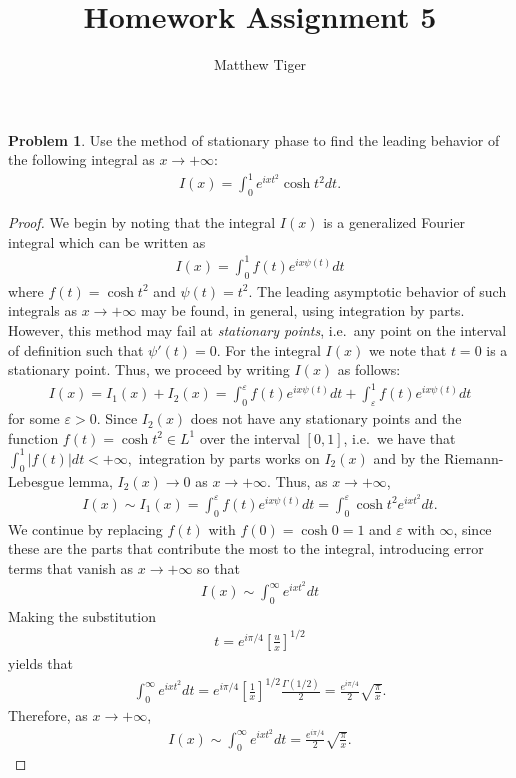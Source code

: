 \documentclass[12pt]{article}
\title{Homework Assignment 5}
\author{Matthew Tiger}
\theoremstyle{definition}
\newtheorem{problem}{Problem}
\begin{document}
\maketitle


\begin{problem}
  Use the method of stationary phase to find the leading behavior of the following
  integral as $x\to +\infty$:
  \begin{align*}
    I(x) = \int_0^1 e^{ixt^2}\cosh t^2 dt.
  \end{align*}
\end{problem}

\begin{proof}
  We begin by noting that the integral $I(x)$ is a generalized Fourier integral
  which can be written as
  \begin{align*}
    I(x) = \int_0^1 f(t) e^{ix\psi(t)} dt
  \end{align*}
  where $f(t) = \cosh t^2$ and $\psi(t) = t^2$. The leading asymptotic behavior of
  such integrals as $x\to+\infty$ may be found, in general, using integration by parts.
  However, this method may fail at \emph{stationary points}, i.e.\ any point on
  the interval of definition such that $\psi'(t) = 0$. For the integral $I(x)$ we note that
  $t=0$ is a stationary point. Thus, we proceed by writing $I(x)$ as follows:
  \begin{align*}
    I(x) = I_1(x) + I_2(x) = \int_0^\varepsilon f(t) e^{ix\psi(t)} dt + \int_\varepsilon^1 f(t) e^{ix\psi(t)} dt
  \end{align*}
  for some $\varepsilon > 0$.
  Since $I_2(x)$ does not have any stationary points and the
  function $f(t) = \cosh t^2 \in L^1$ over the interval $[0, 1]$, i.e.\ we have that $\int_0^1\left|f(t)\right|dt < +\infty,$
  integration by parts works on $I_2(x)$ and by the Riemann-Lebesgue lemma, $I_2(x) \to 0$ as $x \to +\infty$. Thus,
  as $x\to +\infty$,
  \begin{align*}
    I(x) \sim I_1(x) = \int_0^\varepsilon f(t) e^{ix\psi(t)} dt = \int_0^\varepsilon \cosh t^2 e^{ix t^2} dt.
  \end{align*}
  We continue by replacing $f(t)$ with $f(0) = \cosh 0 = 1$ and $\varepsilon$ with $\infty$, since
  these are the parts that contribute the most to the integral, introducing
  error terms that vanish as $x \to +\infty$ so that
  \begin{align*}
    I(x) \sim \int_0^\infty e^{ixt^2}dt
  \end{align*}
  Making the substitution
  \begin{align*}
    t = e^{i\pi/4}\left[\frac{u}{x}\right]^{1/2}
  \end{align*}
  yields that
  \begin{align*}
    \int_0^\infty e^{ixt^2}dt = e^{i\pi/4}\left[\frac{1}{x}\right]^{1/2}\frac{\Gamma(1/2)}{2} = \frac{e^{i\pi/4}}{2}\sqrt{\frac{\pi}{x}}.
  \end{align*}
  Therefore, as $x \to +\infty$,
  \begin{align*}
    I(x) \sim \int_0^\infty e^{ixt^2}dt = \frac{e^{i\pi/4}}{2}\sqrt{\frac{\pi}{x}}.
  \end{align*}
\end{proof}
\newpage
\end{document}
